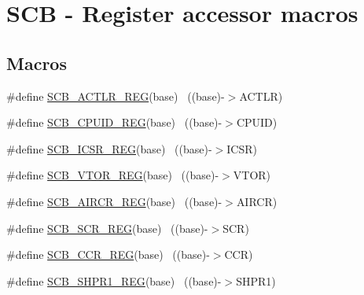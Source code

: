 \hypertarget{group___s_c_b___register___accessor___macros}{}\section{S\+CB -\/ Register accessor macros}
\label{group___s_c_b___register___accessor___macros}
\subsection*{Macros}
\begin{DoxyCompactItemize}
\item 
\#define \hyperlink{group___s_c_b___register___accessor___macros_gacc7b0065f69b9a0d772af30505d9d5e8}{S\+C\+B\+\_\+\+A\+C\+T\+L\+R\+\_\+\+R\+EG}(base)                                        ~((base)-\/$>$A\+C\+T\+LR)
\item 
\#define \hyperlink{group___s_c_b___register___accessor___macros_ga0fafcf57528f45b4ef5f3c5bfa627d55}{S\+C\+B\+\_\+\+C\+P\+U\+I\+D\+\_\+\+R\+EG}(base)                                        ~((base)-\/$>$C\+P\+U\+ID)
\item 
\#define \hyperlink{group___s_c_b___register___accessor___macros_ga32d507fb0a9ba80ad95e451fc93c942a}{S\+C\+B\+\_\+\+I\+C\+S\+R\+\_\+\+R\+EG}(base)                                          ~((base)-\/$>$I\+C\+SR)
\item 
\#define \hyperlink{group___s_c_b___register___accessor___macros_ga882585be47587da934194ffd169da43f}{S\+C\+B\+\_\+\+V\+T\+O\+R\+\_\+\+R\+EG}(base)                                          ~((base)-\/$>$V\+T\+OR)
\item 
\#define \hyperlink{group___s_c_b___register___accessor___macros_ga0510b76b89d5729f2ba9341356553f3e}{S\+C\+B\+\_\+\+A\+I\+R\+C\+R\+\_\+\+R\+EG}(base)                                        ~((base)-\/$>$A\+I\+R\+CR)
\item 
\#define \hyperlink{group___s_c_b___register___accessor___macros_ga6cd310502ec11012af2420c92138fb04}{S\+C\+B\+\_\+\+S\+C\+R\+\_\+\+R\+EG}(base)                                            ~((base)-\/$>$S\+CR)
\item 
\#define \hyperlink{group___s_c_b___register___accessor___macros_gae2955c3c122b0cd8454d0015bcac2780}{S\+C\+B\+\_\+\+C\+C\+R\+\_\+\+R\+EG}(base)                                            ~((base)-\/$>$C\+CR)
\item 
\#define \hyperlink{group___s_c_b___register___accessor___macros_gaabf25516ecaf00639084a339a204456f}{S\+C\+B\+\_\+\+S\+H\+P\+R1\+\_\+\+R\+EG}(base)                                        ~((base)-\/$>$S\+H\+P\+R1)

\end{DoxyCompactItemize}
